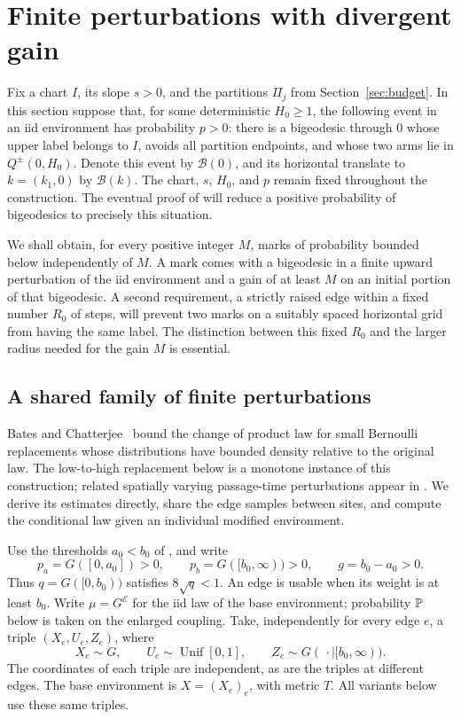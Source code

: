\section{Finite perturbations with divergent gain}\label{sec:tilts}

Fix a chart $I$, its slope $s>0$, and the partitions $\Pi_j$ from
Section~\ref{sec:budget}.  In this section suppose that, for some deterministic
$H_0\geq1$, the following event in an iid environment has probability $p>0$:
there is a bigeodesic through $0$ whose upper label belongs to $I$, avoids
all partition endpoints, and whose two arms lie in $Q^\pm(0,H_0)$.
Denote this event by $\mathcal B(0)$, and its horizontal translate to
$k=(k_1,0)$ by $\mathcal B(k)$.  The chart, $s$, $H_0$, and $p$ remain fixed
throughout the construction.  The eventual proof of  will
reduce a positive probability of bigeodesics to precisely this situation.

We shall obtain, for every positive integer $M$, marks of probability
bounded below independently of $M$.  A mark comes with a bigeodesic in a
finite upward perturbation of the iid environment and a gain of at least
$M$ on an initial portion of that bigeodesic.  A second requirement, a
strictly raised edge within a fixed number $R_0$ of steps, will prevent
two marks on a suitably spaced horizontal grid from having the same
label.  The distinction between this fixed $R_0$ and the larger radius
needed for the gain $M$ is essential.

\subsection{A shared family of finite perturbations}

Bates and Chatterjee~\cite[Lemmas~2.3--2.4]{BatesChatterjee2020}
bound the change of product law for small Bernoulli replacements whose
distributions have bounded density relative to the original law.
The low-to-high replacement below is a monotone instance of this
construction; related spatially varying passage-time perturbations
appear in \cite[Section~2.3]{DembinElboimPeled}.
We derive its estimates directly, share the edge samples between sites,
and compute the conditional law given an individual modified environment.

Use the thresholds $a_0<b_0$ of , and write
\[
 p_a=G([0,a_0])>0,\qquad p_b=G([b_0,\infty))>0,
 \qquad g=b_0-a_0>0.
\]
Thus $q=G([0,b_0))$ satisfies $8\sqrt q<1$.  An edge is usable when its
weight is at least $b_0$. Write $\mu=G^{\mathcal E}$ for the iid law of
the base environment; probability $\mathbb P$ below is taken on the enlarged
coupling. Take, independently for every edge $e$, a triple
$(X_e,U_e,Z_e)$, where
\[
 X_e\sim G,\qquad U_e\sim\operatorname{Unif}[0,1],\qquad
 Z_e\sim G(\,\cdot\mid[b_0,\infty)).
\]
The coordinates of each triple are independent, as are the triples at
different edges.  The base environment is $X=(X_e)_e$, with metric $T$.
All variants below use these same triples.

